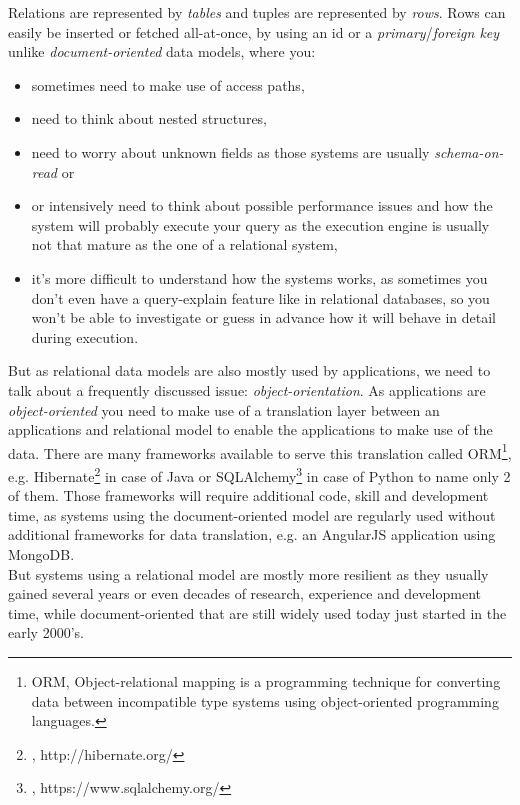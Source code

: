 {\newpage

Relations are represented by \textit{tables} and tuples are represented by \textit{rows}. Rows can easily be inserted or fetched all-at-once, by using an id or a \textit{primary}/\textit{foreign key} unlike \textit{document-oriented} data models, where you:
\begin{itemize}
			\item sometimes need to make use of access paths,
			\item need to think about nested structures,
			\item need to worry about unknown fields as those systems are usually \textit{schema-on-read} or 
			\item or intensively need to think about possible performance issues and how the system will probably execute your query as the execution engine is usually not that mature as the one of a relational system,
			\item it's more difficult to understand how the systems works, as sometimes you don't even have a query-explain feature like in relational databases, so you won't be able to investigate or guess in advance how it will behave in detail during execution.\\ 
\end{itemize}
But as relational data models are also mostly used by applications, we need to talk about a frequently discussed issue: \textit{object-orientation}. As applications are \textit{object-oriented} you need to make use of a translation layer between an applications and relational model to enable the applications to make use of the data. There are many frameworks available to serve this translation called ORM\footnote{ORM, Object-relational mapping is a programming technique for converting data between incompatible type systems using object-oriented programming languages.}, e.g. Hibernate\footnote{\cite{ORMHBN}, http://hibernate.org/} in case of Java or SQLAlchemy\footnote{\cite{ORMSQLAL}, https://www.sqlalchemy.org/} in case of Python to name only 2 of them. Those frameworks will require additional code, skill and development time, as systems using the document-oriented model are regularly used without additional frameworks for data translation, e.g. an AngularJS application using MongoDB. \\
But systems using a relational model are mostly more resilient as they usually gained several years or even decades of research, experience and development time, while document-oriented that are still widely used today just started in the early 2000's.\\
}

